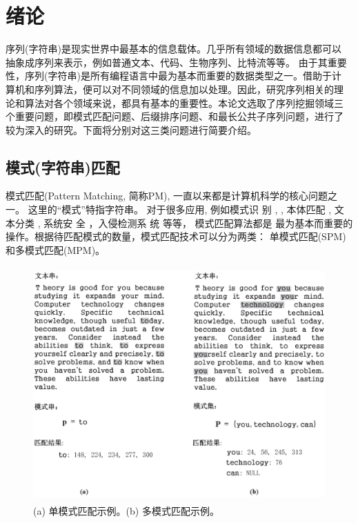 \chapter{绪论}

序列(字符串)是现实世界中最基本的信息载体。几乎所有领域的数据信息都可以
抽象成序列来表示，例如普通文本、代码、生物序列、比特流等等。 由于其重要
性，序列(字符串)是所有编程语言中最为基本而重要的数据类型之一。借助于计
算机和序列算法，便可以对不同领域的信息加以处理。因此，研究序列相关的理
论和算法对各个领域来说，都具有基本的重要性。本论文选取了序列挖掘领域三
个重要问题，即模式匹配问题、后缀排序问题、和最长公共子序列问题，进行了
较为深入的研究。下面将分别对这三类问题进行简要介绍。

\section{模式(字符串)匹配}

模式匹配(Pattern Matching, 简称PM), 一直以来都是计算机科学的核心问题之
一。 这里的“模式”特指字符串。 对于很多应用, 例如模式识
别 \cite{Yan2016}, \cite{Xiao2016}, 本体匹配 \cite{Xue2015}
\cite{Xue2016}, 文本分类 \cite{Tang2015} \cite{Zhang2016}, 系统安
全 \cite{Dien2014,Malhotra2016,Fan2016}，入侵检测系
统 \cite{Kim2015,Arney2016,Sadotra2016,Lee2017} 等等， 模式匹配算法都是
最为基本而重要的操作。根据待匹配模式的数量，模式匹配技术可以分为两类：
单模式匹配(SPM)和多模式匹配(MPM)。

\begin{figure}[H]
  \centering
  \includegraphics[height=9cm ,width=14cm]{figures/1_Introduction/SPM_MPM.eps}
  \caption{(a) 单模式匹配示例。(b) 多模式匹配示例。}
  \label{fig:SPM_MPM}
\end{figure}


